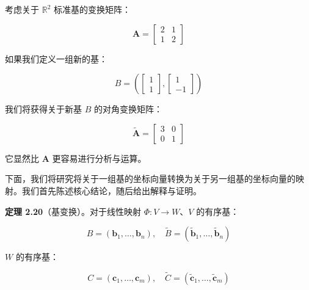 \begin{notebox}
考虑关于 $ \mathbb{R}^2 $ 标准基的变换矩阵：

\begin{equation}
\boldsymbol{A} = \begin{bmatrix} 2 & 1 \\ 1 & 2 \end{bmatrix}
\tag{2.100}\label{eq:2-100}
\end{equation}

如果我们定义一组新的基：

\begin{equation}
B = \left( \begin{bmatrix} 1 \\ 1 \end{bmatrix}, \begin{bmatrix} 1 \\ -1 \end{bmatrix} \right)
\tag{2.101}\label{eq:2-101}
\end{equation}

我们将获得关于新基 $ B $ 的对角变换矩阵：

\begin{equation}
\tilde{\boldsymbol{A}} = \begin{bmatrix} 3 & 0 \\ 0 & 1 \end{bmatrix}
\tag{2.102}\label{eq:2-102}
\end{equation}

它显然比 $ \boldsymbol{A} $ 更容易进行分析与运算。
\end{notebox}

下面，我们将研究将关于一组基的坐标向量转换为关于另一组基的坐标向量的映射。我们首先陈述核心结论，随后给出解释与证明。

\textbf{定理 2.20}（基变换）。对于线性映射 $ \Phi : V \to W $、$ V $ 的有序基：

\begin{equation}
B = (\boldsymbol{b}_1, \ldots, \boldsymbol{b}_n), \quad \tilde{B} = (\tilde{\boldsymbol{b}}_1, \ldots, \tilde{\boldsymbol{b}}_n)
\tag{2.103}\label{eq:2-103}
\end{equation}

$ W $ 的有序基：

\begin{equation}
C = (\boldsymbol{c}_1, \ldots, \boldsymbol{c}_m), \quad \tilde{C} = (\tilde{\boldsymbol{c}}_1, \ldots, \tilde{\boldsymbol{c}}_m)
\tag{2.104}\label{eq:2-104}
\end{equation}

